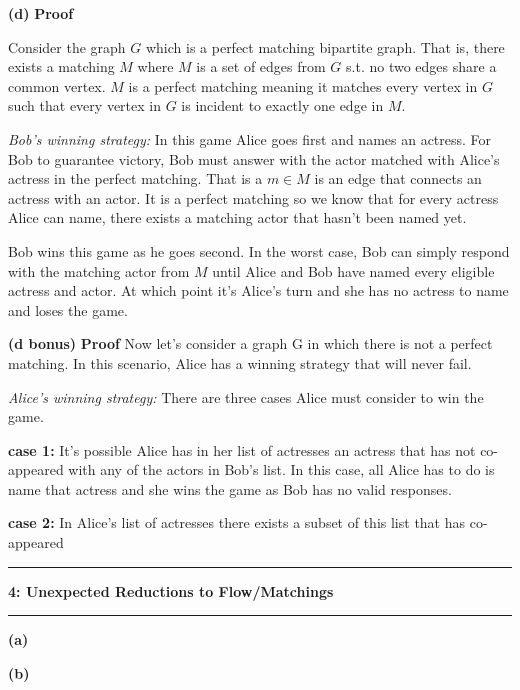\documentclass[11pt]{article}
\newcommand\question[2]{\vspace{.25in}\hrule\textbf{#1: #2}\vspace{.5em}\hrule\vspace{.10in}}
\renewcommand\part[1]{\vspace{.10in}\textbf{(#1)}}
\begin{document}

\part{d} \textbf{Proof} 

Consider the graph $G$ which is a perfect matching bipartite graph. That is, there exists a matching $M$ where $M$ is a set of edges from $G$ s.t. no two edges share a common vertex. $M$ is a perfect matching meaning it matches every vertex in $G$ such that every vertex in $G$ is incident to exactly one edge in $M$.

\textit{Bob's winning strategy:} In this game Alice goes first and names an actress. For Bob to guarantee victory, Bob must answer with the actor matched with Alice's actress in the perfect matching. That is a $m \in M$ is an edge that connects an actress with an actor. It is a perfect matching so we know that for every actress Alice can name, there exists a matching actor that hasn't been named yet.

Bob wins this game as he goes second. In the worst case, Bob can simply respond with the matching actor from $M$ until Alice and Bob have named every eligible actress and actor. At which point it's Alice's turn and she has no actress to name and loses the game.

\part{d bonus} \textbf{Proof}
Now let's consider a graph G in which there is not a perfect matching. In this scenario, Alice has a winning strategy that will never fail.

\textit{Alice's winning strategy:} There are three cases Alice must consider to win the game.

\textbf{case 1:} It's possible Alice has in her list of actresses an actress that has not co-appeared with any of the actors in Bob's list. In this case, all Alice has to do is name that actress and she wins the game as Bob has no valid responses.

\textbf{case 2:} In Alice's list of actresses there exists a subset of this list that has co-appeared

\question{4}{Unexpected Reductions to Flow/Matchings}

\part{a}

\part{b}
\end{document}
